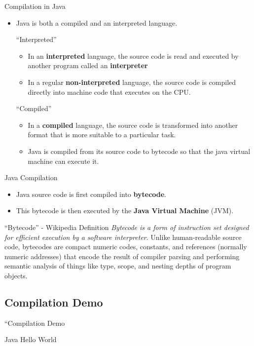 \documentclass[table,xcolor=table]{IFMG-beamer}
\begin{document}
\begin{frame}{Compilation in Java}

  \begin{itemize}[<+->]
    \item Java is both a compiled and an interpreted language.
    \begin{block}{``Interpreted''}
      \begin{itemize}
        \item In an \textbf{interpreted} language, the source code is read and executed by another program called an \textbf{interpreter} \\
        \item In a regular \textbf{non-interpreted} language, the source code is compiled directly into machine code that executes on the CPU. \\
      \end{itemize}
    \end{block}
    \begin{block}{``Compiled''}
      \begin{itemize}
        \item In a \textbf{compiled} language, the source code is transformed into another format that is more suitable to a particular task. 
        \item Java is compiled from its source code to bytecode so that the java virtual machine can execute it.  \\
      \end{itemize}
    \end{block}
  \end{itemize}

\end{frame}

\begin{frame}{Java Compilation}
  \begin{itemize}
    \item Java source code is first compiled into \textbf{bytecode}.
    \item This bytecode is then executed by the \textbf{Java Virtual Machine} (JVM).
  \end{itemize}

  \begin{block}{``Bytecode'' - Wikipedia Definition}
    \textit{Bytecode is a form of instruction set designed for efficient execution by a software interpreter}. Unlike human-readable source code, bytecodes are compact numeric codes, constants, and references (normally numeric addresses) that encode the result of compiler parsing and performing semantic analysis of things like type, scope, and nesting depths of program objects.
  \end{block}
\end{frame}

\subsection{Compilation Demo}
\begin{frame}{``Compilation Demo}
  \begin{block}{Java Hello World}
    \inputminted{C}{code/hello_world.java}
  \end{block}
\end{frame}
\end{document}
